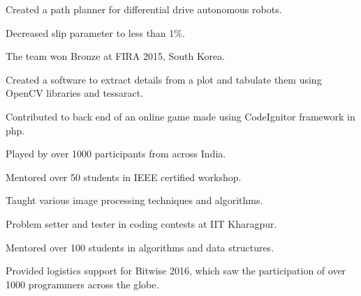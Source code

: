 \documentclass[a4paper]{deedy-resume} %
\begin{document}
\begin{minipage}[t]{0.66\textwidth}
  \sectionspace

  \runsubsection{}
  \begin{tightitemize}
  \item Created a path planner for differential drive autonomous robots.
  \item Decreased slip parameter to less than 1\%.
  \item The team won Bronze at FIRA 2015, South Korea.
  \end{tightitemize}

  \sectionspace

  \runsubsection{}
  \begin{tightitemize}
  \item Created a software to extract details from a plot and tabulate them using OpenCV libraries and tessaract.
  \end{tightitemize}

  \sectionspace

  \runsubsection{}
  \begin{tightitemize}
  \item Contributed to back end of an online game made using CodeIgnitor framework in php.
  \item Played by over 1000 participants from across India.
  \end{tightitemize}


  \sectionspace

  \runsubsection{}
  \begin{tightitemize}
  \item Mentored over 50 students in IEEE certified workshop.
  \item Taught various image processing techniques and algorithms.
  \end{tightitemize}

  \sectionspace

  \runsubsection{}
  \begin{tightitemize}
  \item Problem setter and tester in coding contests at IIT Kharagpur.
  \item Mentored over 100 students in algorithms and data structures.
  \item Provided logistics support for Bitwise 2016, which saw the participation of over 1000 programmers across the globe.
  \end{tightitemize}
  

\end{minipage}
\end{document}
